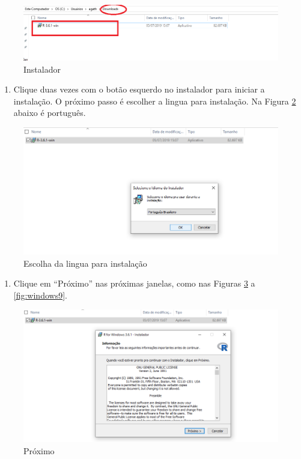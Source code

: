 \documentclass[
]{book}
\providecommand{\tightlist}{%
  \setlength{\itemsep}{0pt}\setlength{\parskip}{0pt}}
\begin{document}
\begin{figure}
\includegraphics[width=1\linewidth]{figures/install_Windows2} \caption{Instalador}\label{fig:windows2}
\end{figure}

\begin{enumerate}
\def\labelenumi{\arabic{enumi})}
\setcounter{enumi}{2}
\tightlist
\item
  Clique duas vezes com o botão esquerdo no instalador para iniciar a instalação. O próximo passo é escolher a lingua para instalação. Na Figura \ref{fig:windows3} abaixo é português.
\end{enumerate}

\begin{figure}
\includegraphics[width=1\linewidth]{figures/install_Windows3} \caption{Escolha da lingua para instalação}\label{fig:windows3}
\end{figure}

\begin{enumerate}
\def\labelenumi{\arabic{enumi})}
\setcounter{enumi}{3}
\tightlist
\item
  Clique em ``Próximo'' nas próximas janelas, como nas Figuras \ref{fig:windows4} a \ref{fig:windows9}.
\end{enumerate}

\begin{figure}
\includegraphics[width=1\linewidth]{figures/install_Windows4} \caption{Próximo }\label{fig:windows4}
\end{figure}
\end{document}
